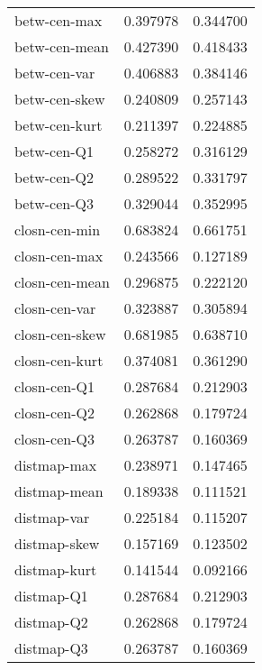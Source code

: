 \documentclass{report}
\begin{document}
\begin{longtable}{lrr}
	betw-cen-max                  &  0.397978 &  0.344700 \\
	betw-cen-mean                 &  0.427390 &  0.418433 \\
	betw-cen-var                  &  0.406883 &  0.384146 \\
	betw-cen-skew                 &  0.240809 &  0.257143 \\
	betw-cen-kurt                 &  0.211397 &  0.224885 \\
	betw-cen-Q1                   &  0.258272 &  0.316129 \\
	betw-cen-Q2                   &  0.289522 &  0.331797 \\
	betw-cen-Q3                   &  0.329044 &  0.352995 \\
	closn-cen-min                 &  0.683824 &  0.661751 \\
	closn-cen-max                 &  0.243566 &  0.127189 \\
	closn-cen-mean                &  0.296875 &  0.222120 \\
	closn-cen-var                 &  0.323887 &  0.305894 \\
	closn-cen-skew                &  0.681985 &  0.638710 \\
	closn-cen-kurt                &  0.374081 &  0.361290 \\
	closn-cen-Q1                  &  0.287684 &  0.212903 \\
	closn-cen-Q2                  &  0.262868 &  0.179724 \\
	closn-cen-Q3                  &  0.263787 &  0.160369 \\
	distmap-max                   &  0.238971 &  0.147465 \\
	distmap-mean                  &  0.189338 &  0.111521 \\
	distmap-var                   &  0.225184 &  0.115207 \\
	distmap-skew                  &  0.157169 &  0.123502 \\
	distmap-kurt                  &  0.141544 &  0.092166 \\
	distmap-Q1                    &  0.287684 &  0.212903 \\
	distmap-Q2                    &  0.262868 &  0.179724 \\
	distmap-Q3                    &  0.263787 &  0.160369 \\
\end{longtable}
\end{document}
